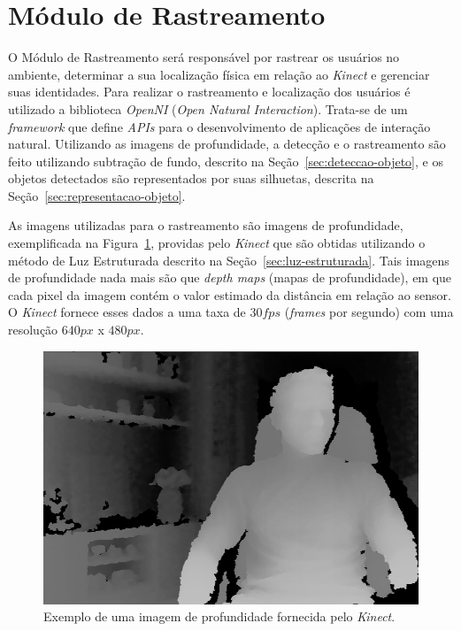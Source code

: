 \section{Módulo de Rastreamento}

	O Módulo de Rastreamento será responsável por rastrear os usuários no
	ambiente, determinar a sua localização física em relação ao \textit{Kinect} e
	gerenciar suas identidades. Para realizar o rastreamento e localização dos
	usuários é utilizado a biblioteca \textit{OpenNI} (\textit{Open Natural
	Interaction}). Trata-se de um \textit{framework} que define \textit{APIs} para
	o desenvolvimento de aplicações de interação natural. Utilizando as imagens de
	profundidade, a detecção e o rastreamento são feito utilizando subtração de
	fundo, descrito na Seção~\ref{sec:deteccao-objeto}, e os objetos detectados são
	representados por suas silhuetas, descrita na
	Seção~\ref{sec:representacao-objeto}.

	As imagens utilizadas para o rastreamento são imagens de profundidade,
	exemplificada na Figura~\ref{fig:depthmaps}, providas pelo \textit{Kinect} que
	são obtidas utilizando o método de Luz Estruturada descrito na
	Seção~\ref{sec:luz-estruturada}. Tais imagens de profundidade nada mais são
	que \textit{depth maps} (mapas de profundidade), em que cada pixel da imagem
	contém o valor estimado da distância em relação ao sensor. O \textit{Kinect}
	fornece esses dados a uma taxa de $\displaystyle 30 fps$ (\textit{frames} por
	segundo) com uma resolução $\displaystyle 640px$ x $\displaystyle 480px$.
	

	\begin{figure}[H]
		\begin{center}
			\includegraphics[scale=0.45]{figuras/4.ProblemaEProposta/mapa-profundidade.png}
		\end{center}
		\caption{Exemplo de uma imagem de profundidade fornecida pelo \textit{Kinect}.}
		\label{fig:depthmaps}
	\end{figure}

